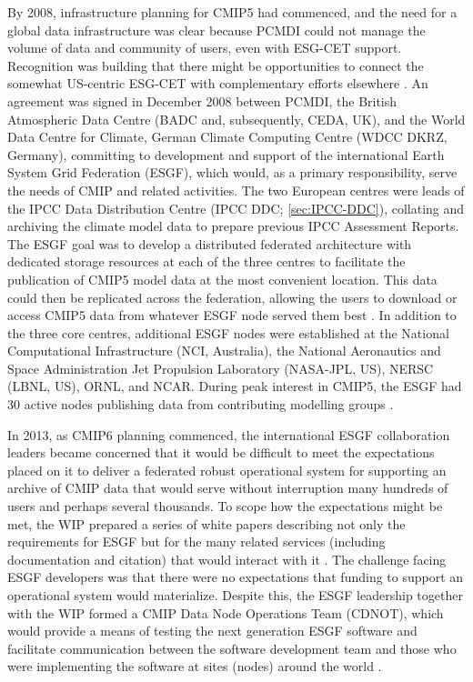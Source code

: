 \documentclass[manuscript]{copernicus}
\begin{document}
By 2008, infrastructure planning for CMIP5 had commenced, and the need for a global data infrastructure was clear because PCMDI could not manage the volume of data and community of users, even with ESG-CET support. Recognition was building that there might be opportunities to connect the somewhat US-centric ESG-CET with complementary efforts elsewhere \citep[e.g.,][]{williams_doe_2011,williams_earth_2009,williams_earth_2011}. An agreement was signed in December 2008 between PCMDI, the British Atmospheric Data Centre (BADC and, subsequently, CEDA, UK), and the World Data Centre for Climate, German Climate Computing Centre (WDCC DKRZ, Germany), committing to development and support of the international Earth System Grid Federation (ESGF), which would, as a primary responsibility, serve the needs of CMIP and related activities. The two European centres were leads of the IPCC Data Distribution Centre (IPCC DDC; \autoref{sec:IPCC-DDC}), collating and archiving the climate model data to prepare previous IPCC Assessment Reports. The ESGF goal was to develop a distributed federated architecture with dedicated storage resources at each of the three centres to facilitate the publication of CMIP5 model data at the most convenient location. This data could then be replicated across the federation, allowing the users to download or access CMIP5 data from whatever ESGF node served them best \citep{williams_earth_2011}. In addition to the three core centres, additional ESGF nodes were established at the National Computational Infrastructure (NCI, Australia), the National Aeronautics and Space Administration Jet Propulsion Laboratory (NASA-JPL, US), NERSC (LBNL, US), ORNL, and NCAR. During peak interest in CMIP5, the ESGF had 30 active nodes publishing data from contributing modelling groups \citep[see \autoref{tab:tab1-MIPsThroughTime};][]{williams_global_2016}.

In 2013, as CMIP6 planning commenced, the international ESGF collaboration leaders became concerned that it would be difficult to meet the expectations placed on it to deliver a federated robust operational system for supporting an archive of CMIP data that would serve without interruption many hundreds of users and perhaps several thousands. To scope how the expectations might be met, the WIP prepared a series of white papers describing not only the requirements for ESGF but for the many related services (including documentation and citation) that would interact with it \citep{balaji_requirements_2018}. The challenge facing ESGF developers was that there were no expectations that funding to support an operational system would materialize. Despite this, the ESGF leadership together with the WIP formed a CMIP Data Node Operations Team (CDNOT), which would provide a means of testing the next generation ESGF software and facilitate communication between the software development team and those who were implementing the software at sites (nodes) around the world \citep{petrie_coordinating_2021}. 
\end{document}
